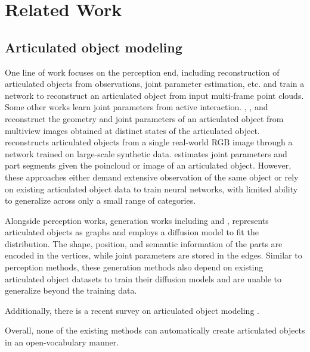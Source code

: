 \section{Related Work}
\subsection{Articulated object modeling} 
One line of work focuses on the perception end, including reconstruction of articulated objects from observations, joint parameter estimation, etc. \cite{jiang2022ditto} and \cite{huang2021multibodysync} train a network to reconstruct an articulated object from input multi-frame point clouds. Some other works \citep{hsu2023ditto, gadre2021act, nie2023structure, wang2022adaafford} learn joint parameters from active interaction. \cite{liu2023paris}, \cite{weng2024neural}, \cite{wei2022self} and \cite{mandi2024real2code} reconstruct the geometry and joint parameters of an articulated object from multiview images obtained at distinct states of the articulated object. \cite{chen2024urdformer} reconstructs articulated objects from a single real-world RGB image through a network trained on large-scale synthetic data. \citep{li2020category, jiang2022opd, sun2024opdmulti, yan2020rpm, liu2022toward, liu2023self, geng2023gapartnet} estimates joint parameters and part segments given the poincloud or image of an articulated object. However, these approaches either demand extensive observation of the same object or rely on existing articulated object data to train neural networks, with limited ability to generalize across only a small range of categories.

Alongside perception works, generation works including  \cite{lei2023nap} and \cite{liu2024cage}, represents articulated objects as graphs and employs a diffusion model to fit the distribution. The shape, position, and semantic information of the parts are encoded in the vertices, while joint parameters are stored in the edges.  Similar to perception methods, these generation methods also depend on existing articulated object datasets to train their diffusion models and are unable to generalize beyond the training data. 

Additionally, there is a recent survey on articulated object modeling \cite{liu2024survey}.

Overall, none of the existing methods can automatically create articulated objects in an open-vocabulary manner. 

